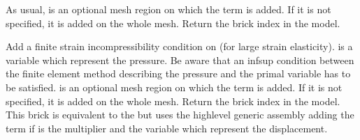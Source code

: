 \documentclass[a4paper,11pt,english]{sphinxmanual}
\begin{document}
\begin{fulllineitems}
\begin{fulllineitems}
\begin{itemize}
\end{itemize}

As usual,  is an optional mesh region on which the term is added.
If it is not specified, it is added on the whole mesh.
Return the brick index in the model.

\end{fulllineitems}


\begin{fulllineitems}
\label{\detokenize{python/cmdref_Model:getfem.Model.add_finite_strain_incompressibility_brick}}
Add a finite strain incompressibility condition on  (for large
strain elasticity). 
is a variable which represent the pressure. Be aware that an inf\sphinxhyphen{}sup
condition between the finite element method describing the pressure and the
primal variable has to be satisfied.  is an optional mesh region on
which the term is added. If it is not specified, it is added on the
whole mesh. Return the brick index in the model.
This brick is equivalent to the  but
uses the high\sphinxhyphen{}level generic assembly adding the term
 if  is the multiplier and
 the variable which represent the displacement.

\end{fulllineitems}



\end{fulllineitems}
\end{document}
